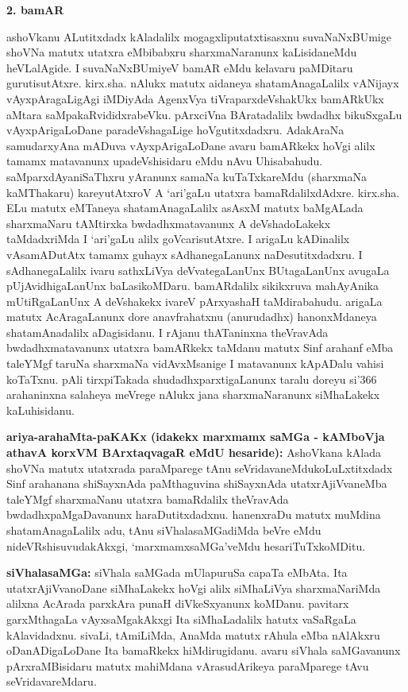 \begin{center}
{\textbf{\Large 2. bamAR}}
\end{center}
   
ashoVkanu ALutitxdadx kAladalilx mogagxliputatxtisasxnu suvaNaNxBUmige shoVNa matutx utatxra eMbibabxru sharxmaNaranunx kaLisidaneMdu heVLalAgide. I suvaNaNxBUmiyeV bamAR eMdu kelavaru paMDitaru gurutisutAtxre. kirx.sha. nAlukx matutx aidaneya shatamAnagaLalilx vANijayx vAyxpAragaLigAgi iMDiyAda AgenxVya tiVraparxdeVshakUkx bamARkUkx aMtara saMpakaRvididxrabeVku. pArxciVna BAratadalilx bwdadhx bikuSxgaLu vAyxpArigaLoDane paradeVshagaLige hoVgutitxdadxru. AdakAraNa samudarxyAna mADuva vAyxpArigaLoDane avaru bamARkekx hoVgi alilx tamamx matavanunx upadeVshisidaru eMdu nAvu Uhisabahudu. saMparxdAyaniSaThxru yAranunx samaNa kuTaTxkareMdu (sharxmaNa kaMThakaru) kareyutAtxroV A `ari'gaLu utatxra bamaRdalilxdAdxre. kirx.sha. ELu matutx eMTaneya shatamAnagaLalilx asAsxM matutx baMgALada sharxmaNaru tAMtirxka bwdadhxmatavanunx A deVshadoLakekx taMdadxriMda I `ari'gaLu alilx goVcarisutAtxre. I arigaLu kADinalilx vAsamADutAtx tamamx guhayx sAdhanegaLanunx naDesutitxdadxru. I sAdhanegaLalilx ivaru sathxLiVya deVvategaLanUnx BUtagaLanUnx avugaLa pUjAvidhigaLanUnx baLasikoMDaru. bamARdalilx sikikxruva mahAyAnika mUtiRgaLanUnx A deVshakekx ivareV pArxyashaH taMdirabahudu. arigaLa matutx AcAragaLanunx dore anavfrahatxnu (anurudadhx) hanonxMdaneya shatamAnadalilx aDagisidanu. I rAjanu thATaninxna theVravAda bwdadhxmatavanunx utatxra bamARkekx taMdanu matutx Sinf arahanf eMba taleYMgf taruNa sharxmaNa vidAvxMsanige I matavanunx kApADalu vahisi koTaTxnu. pAli tirxpiTakada shudadhxparxtigaLanunx taralu doreyu si\char'366~ arahaninxna salaheya meVrege nAlukx jana sharxmaNaranunx siMhaLakekx kaLuhisidanu.

\smallskip

{\bf ariya-arahaMta-paKAKx (idakekx marxmamx saMGa - kAMboVja athavA korxVM BArxtaqvagaR eMdU hesaride):} AshoVkana kAlada shoVNa matutx utatxrada paraMparege tAnu seVridavaneMdukoLuLxtitxdadx Sinf arahanana shiSayxnAda paMthaguvina shiSayxnAda utatxrAjiVvaneMba taleYMgf sharxmaNanu utatxra bamaRdalilx theVravAda bwdadhxpaMgaDavanunx haraDutitxdadxnu. hanenxraDu matutx muMdina shatamAnagaLalilx adu, tAnu siVhalasaMGadiMda beVre eMdu nideVRshisuvudakAkxgi, `marxmamxsaMGa'veMdu hesariTuTxkoMDitu.

\smallskip

{\bf siVhalasaMGa:} siVhala saMGada mUlapuruSa capaTa eMbAta. Ita utatxrAjiVvanoDane siMhaLakekx hoVgi alilx siMhaLiVya sharxmaNariMda alilxna AcArada parxkAra punaH diVkeSxyanunx koMDanu. pavitarx garxMthagaLa vAyxsaMgakAkxgi Ita siMhaLadalilx hatutx vaSaRgaLa kAlavidadxnu. sivaLi, tAmiLiMda, AnaMda matutx rAhula eMba nAlAkxru oDanADigaLoDane Ita bamaRkekx hiMdirugidanu. avaru siVhala saMGavanunx pArxraMBisidaru matutx mahiMdana vArasudArikeya paraMparege tAvu seVridavareMdaru.

